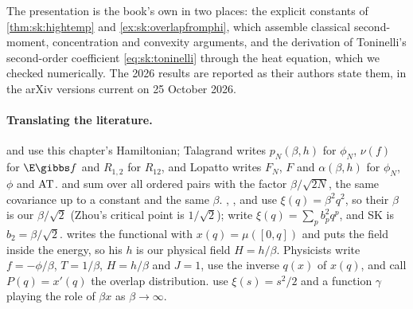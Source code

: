 \begin{refsection}
The presentation is the book's own in two places: the explicit constants of \cref{thm:sk:hightemp} and \cref{ex:sk:overlapfromphi}, which assemble classical second-moment, concentration and convexity arguments, and the derivation of Toninelli's second-order coefficient \eqref{eq:sk:toninelli} through the heat equation, which we checked numerically. The 2026 results are reported as their authors state them, in the arXiv versions current on 25 October 2026.

\paragraph{Translating the literature.} \textcite{Talagrand2011a} and \textcite{Lopatto2026a} use this chapter's Hamiltonian; Talagrand writes $p_N(\beta,h)$ for $\phi_N$, $\nu(f)$ for $\E\gibbs f$ and $R_{1,2}$ for $R_{12}$, and Lopatto writes $F_N$, $F$ and $\alpha(\beta,h)$ for $\phi_N$, $\phi$ and $\mathrm{AT}$. \textcite{KusuokaNakajima2026b} and \textcite{Lopatto2026b} sum over all ordered pairs with the factor $\beta/\sqrt{2N}$, the same covariance up to a constant and the same $\beta$. \textcite{Panchenko2013b}, \textcite{Panchenko2014}, \textcite{AuffingerChen2015a} and \textcite{Zhou2026} use $\xi(q)=\beta^2q^2$, so their $\beta$ is our $\beta/\sqrt2$ (Zhou's critical point is $1/\sqrt2$); \textcite{AronowLopatto2026b} write $\xi(q)=\sum_pb_p^2q^p$, and SK is $b_2=\beta/\sqrt2$. \textcite{Guerra2003} writes the functional with $x(q)=\mu([0,q])$ and puts the field inside the energy, so his $h$ is our physical field $H=h/\beta$. Physicists write $f=-\phi/\beta$, $T=1/\beta$, $H=h/\beta$ and $J=1$, use the inverse $q(x)$ of $x(q)$, and call $P(q)=x'(q)$ the overlap distribution. \textcite{AuffingerChen2017} use $\xi(s)=s^2/2$ and a function $\gamma$ playing the role of $\beta x$ as $\beta\to\infty$.

\printchapterbib
\end{refsection}

